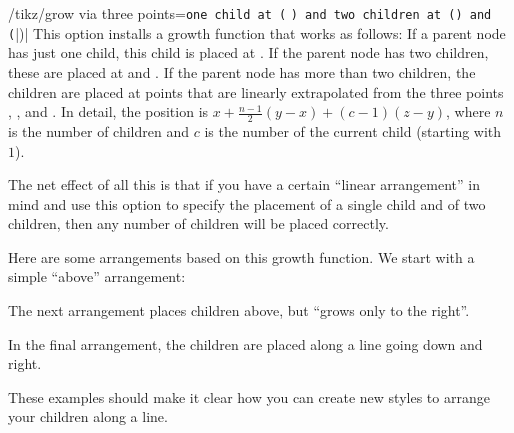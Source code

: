 \begin{key}{/tikz/grow via three points=\texttt{one child at (}
        \texttt{) and two children at (}\texttt{) and (}|)|%
}
    This option installs a growth function that works as follows: If a parent
    node has just one child, this child is placed at . If the parent
    node has two children, these are placed at  and . If the
    parent node has more than two children, the children are placed at points
    that are linearly extrapolated from the three points , ,
    and . In detail, the position is $x + \frac{n-1}{2}(y-x) +
    (c-1)(z-y)$, where $n$ is the number of children and $c$ is the number of
    the current child (starting with~$1$).

    The net effect of all this is that if you have a certain ``linear
    arrangement'' in mind and use this option to specify the placement of a
    single child and of two children, then any number of children will be
    placed correctly.

    Here are some arrangements based on this growth function. We start with a
    simple ``above'' arrangement:
\begin{codeexample}[preamble={\usetikzlibrary{trees}}]
\end{codeexample}

    The next arrangement places children above, but ``grows only to the
    right''.
\begin{codeexample}[preamble={\usetikzlibrary{trees}}]
\end{codeexample}

    In the final arrangement, the children are placed along a line going down
    and right.
\begin{codeexample}[preamble={\usetikzlibrary{trees}}]
\end{codeexample}

    These examples should make it clear how you can create new styles to
    arrange your children along a line.
\end{key}

